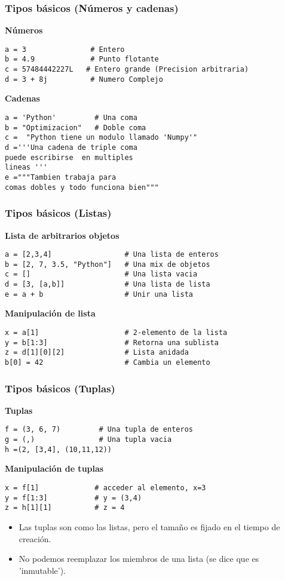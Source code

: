 \documentclass[10pt]{beamer}
\begin{document}
\begin{frame}[fragile]
\frametitle{Tipos b\'asicos (N\'umeros y cadenas)}
\textbf{N\'umeros}
\begin{lstlisting}
a = 3               # Entero
b = 4.9             # Punto flotante
c = 57484442227L   # Entero grande (Precision arbitraria)
d = 3 + 8j          # Numero Complejo
\end{lstlisting}

\vspace{0.2cm}

\textbf{Cadenas}

\begin{lstlisting}
a = 'Python'         # Una coma
b = "Optimizacion"   # Doble coma
c =  "Python tiene un modulo llamado 'Numpy'"
d ='''Una cadena de triple coma
puede escribirse  en multiples
lineas '''
e ="""Tambien trabaja para 
comas dobles y todo funciona bien"""
\end{lstlisting}
\end{frame}
\begin{frame}[fragile]
\frametitle{Tipos b\'asicos (Listas)}
\textbf{Lista de arbitrarios objetos}

\begin{lstlisting}
a = [2,3,4]                 # Una lista de enteros
b = [2, 7, 3.5, "Python"]   # Una mix de objetos
c = []                      # Una lista vacia
d = [3, [a,b]]              # Una lista de lista
e = a + b                   # Unir una lista
\end{lstlisting}

\textbf{Manipulaci\'on de lista}

\begin{lstlisting}
x = a[1]                    # 2-elemento de la lista
y = b[1:3]                  # Retorna una sublista
z = d[1][0][2]              # Lista anidada
b[0] = 42                   # Cambia un elemento
\end{lstlisting}

\end{frame}
\begin{frame}[fragile]
\frametitle{Tipos b\'asicos (Tuplas)}
\textbf{Tuplas}

\begin{lstlisting}
f = (3, 6, 7)         # Una tupla de enteros
g = (,)               # Una tupla vacia
h =(2, [3,4], (10,11,12))   
\end{lstlisting}

\textbf{Manipulaci\'on de tuplas}
\begin{lstlisting}
x = f[1]             # acceder al elemento, x=3
y = f[1:3]           # y = (3,4)
z = h[1][1]          # z = 4
\end{lstlisting}

\vspace{0.3cm}
\begin{itemize}
\item Las tuplas son como las listas, pero el tama\~no es fijado en el tiempo de creaci\'on.
\item No podemos reemplazar los miembros de una lista (se dice que es 'inmutable').
\end{itemize}
\end{frame}
\end{document}
